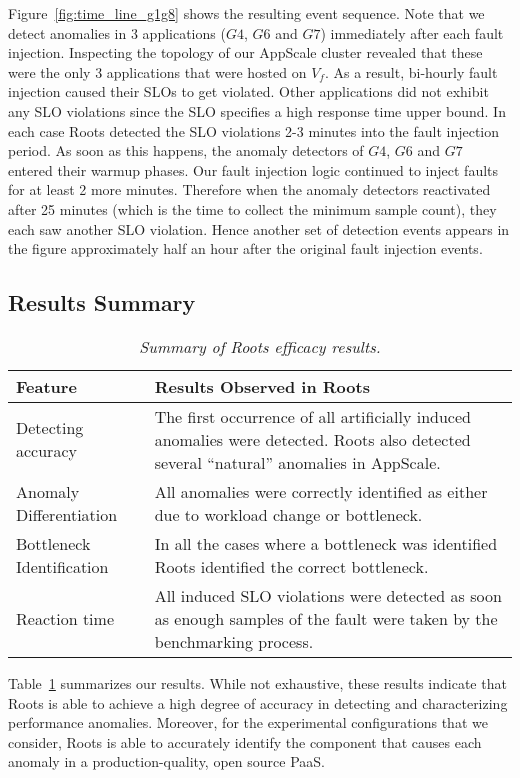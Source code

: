 Figure~\ref{fig:time_line_g1g8} shows the resulting event sequence. Note that we detect anomalies 
in 3 applications ($G4$, $G6$ and $G7$) immediately after each fault injection. Inspecting the 
topology of our AppScale cluster revealed that these were the only 3 applications that were 
hosted on $V_f$. As a result, bi-hourly fault injection caused their SLOs to
get violated. Other applications did not exhibit any SLO violations since 
the SLO specifies 
a high response time upper bound. In each case Roots detected the SLO violations 2-3 minutes into the fault injection
period. As soon as this happens, the anomaly detectors of $G4$, $G6$ and $G7$ entered their warmup phases.
Our fault injection logic continued to inject faults for at least 2 more minutes. 
Therefore when the anomaly detectors
reactivated after 25 minutes (which is the time to collect the minimum sample count), they each saw another SLO
violation. Hence another set of detection events appears in the figure
approximately half an hour after the
original fault injection events.

\subsection{Results Summary}

\begin{table}
{\footnotesize
\begin{center}
\begin{tabular}{|p{2cm}|p{6cm}|}
\hline
Feature & Results Observed in Roots \\ \hline
Detecting accuracy &
The first occurrence of all artificially induced anomalies were detected.
Roots also detected several ``natural'' anomalies in AppScale. \\ \hline
Anomaly Differentiation &
All anomalies were correctly identified as either due to workload change or
bottleneck. \\ \hline
Bottleneck Identification &
In all the cases where a bottleneck was identified Roots identified the
correct bottleneck. \\ \hline
Reaction time &
All induced SLO violations were detected as soon
as enough samples of the fault
were taken by the benchmarking process. \\
\hline
\end{tabular}
\end{center}
}
\caption{\textit{Summary of Roots efficacy results.
\label{tab:results_summary}
}}
\end{table}
Table~\ref{tab:results_summary} summarizes our results.
While not exhaustive, these results indicate that Roots is able to achieve a
high degree of accuracy in detecting and characterizing performance anomalies.
Moreover, for the experimental configurations that we consider, Roots is able to accurately identify
the component that causes each anomaly in a production-quality, open source PaaS.

